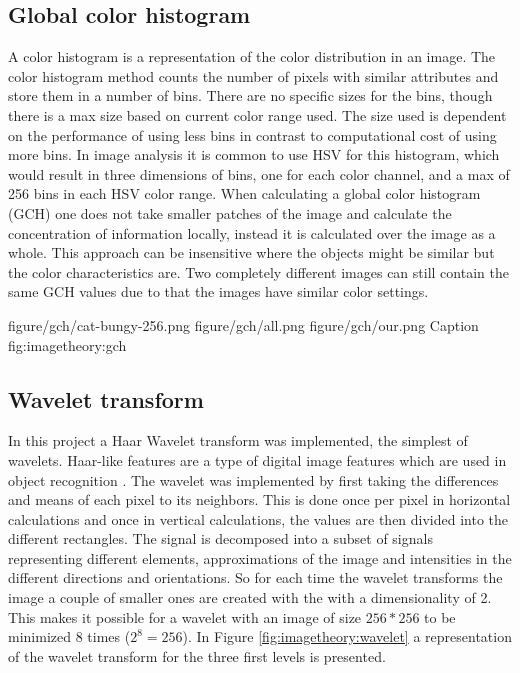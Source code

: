 \subsection{Global color histogram}
\label{sec:gch_feature}

A color histogram is a representation of the color distribution in an image. The color histogram method counts the number of pixels with similar attributes and store them in a number of bins. There are no specific sizes for the bins, though there is a max size based on current color range used. The size used is dependent on the performance of using less bins in contrast to computational cost of using more bins. In image analysis it is common to use HSV for this histogram, which would result in three dimensions of bins, one for each color channel, and a max of 256 bins in each HSV color range. When calculating a global color histogram (GCH) one does not take smaller patches of the image and calculate the concentration of information locally, instead it is calculated over the image as a whole. This approach can be insensitive where the objects might be similar but the color characteristics are. Two completely different images can still contain the same GCH values due to that the images have similar color settings.

\threefigure
{figure/gch/cat-bungy-256.png}
{figure/gch/all.png}
{figure/gch/our.png}
{Caption}
{fig:imagetheory:gch} 

\subsection{Wavelet transform}
\label{sec:wlt_feature}

In this project a Haar Wavelet transform was implemented, the simplest of wavelets. Haar-like features are a type of digital image features which are used in object recognition \cite{pavani2010haar}. The wavelet was implemented by first taking the differences and means of each pixel to its neighbors. This is done once per pixel in horizontal calculations and once in vertical calculations, the values are then divided into the different rectangles. The signal is decomposed into a subset of signals representing different elements, approximations of the image and intensities in the different directions and orientations. So for each time the wavelet transforms the image a couple of smaller ones are created with the with a dimensionality of 2. This makes it possible for a wavelet with an image of size $256*256$ to be minimized 8 times ($2^8 = 256$). In Figure \ref{fig:imagetheory:wavelet} a representation of the wavelet transform for the three first levels is presented.

